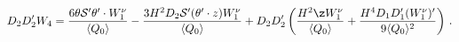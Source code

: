 \begin{equation*}
D_{2}D'_{2} W_{4}=\frac{6\theta{\cal S }'\theta'\cdot
W^{\nu}_{1}}{\langle Q_{0}\rangle}-\frac{3H^{2}D_{2}{\cal S
}'(\theta'\cdot z)W^{\nu}_{1}}{\langle Q_{0}\rangle}
+D_{2}D'_{2}\left(\frac{H^{2}\z   W^{\nu}_{1}}{\langle
Q_{0}\rangle}+\frac{H^{4}D_{1}D'_{1}( W^{\nu}_{1})'}{9\langle
Q_{0}\rangle^{2}}\right)\,.
\end{equation*}

